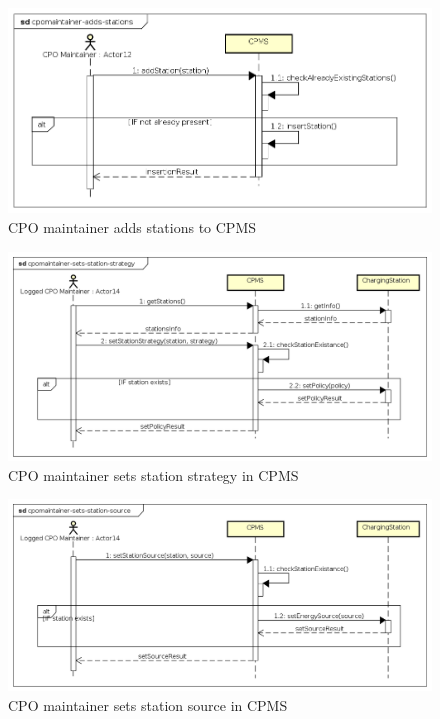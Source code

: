 \begin{figure}[!h]
    \begin{center}
        \includegraphics[keepaspectratio, width=16cm]{Sequence/cpomaintainer-adds-stations.png}
        \caption{\ac{CPO} maintainer adds stations to \ac{CPMS}}
    \end{center}
\end{figure}
\begin{figure}[!h]
    \begin{center}
        \includegraphics[keepaspectratio, width=16cm]{Sequence/cpomaintainer-sets-station-strategy.png}
        \caption{\ac{CPO} maintainer sets station strategy in \ac{CPMS}}
    \end{center}
\end{figure}

\begin{figure}[!h]
    \begin{center}
        \includegraphics[keepaspectratio, width=16cm]{Sequence/cpomaintainer-sets-station-source.png}
        \caption{\ac{CPO} maintainer sets station source in \ac{CPMS}}
    \end{center}
\end{figure}

